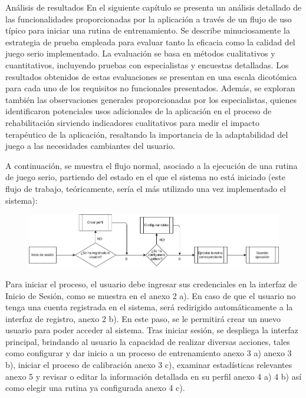 \begin{thesischapter}{3} {Análisis de resultados}
    En el siguiente capítulo se presenta un análisis detallado de las funcionalidades proporcionadas por la aplicación a 
    través de un flujo de uso típico para iniciar una rutina de entrenamiento. Se describe minuciosamente la estrategia 
    de prueba empleada para evaluar tanto la eficacia como la calidad del juego serio implementado. La evaluación se basa 
    en métodos cualitativos y cuantitativos, incluyendo pruebas con especialistas y encuestas detalladas. Los resultados 
    obtenidos de estas evaluaciones se presentan en una escala dicotómica para cada uno de los requisitos no funcionales
    presentados. Además, se exploran también las observaciones generales proporcionadas por los especialistas, quienes 
    identificaron potenciales usos adicionales de la aplicación en el proceso de rehabilitación sirviendo indicadores 
    cualitativos para medir el impacto terapéutico de la aplicación, resaltando la importancia de la adaptabilidad del 
    juego a las necesidades cambiantes del usuario.  
    


    A continuación, se muestra el flujo normal, asociado a la ejecución de una rutina
    de juego serio, partiendo del estado en el que el sistema no está iniciado (este flujo de trabajo,
    teóricamente, sería el más utilizado una vez implementado el sistema):

    \begin{figure}[ht]
        \centering
        \includegraphics[scale=0.5]{images/diagram-flow.png}
        \caption{}
        \label{fig: diagram-flow}
    \end{figure}
    
    Para iniciar el proceso, el usuario debe ingresar sus credenciales en la interfaz de Inicio de Sesión, 
    como se muestra en el anexo 2 a). En caso de que el usuario no tenga una cuenta registrada en el 
    sistema, será redirigido automáticamente a la interfaz de registro, anexo 2 b). 
    En este paso, se le permitirá crear un nuevo usuario para poder acceder al sistema. Tras iniciar sesión, se 
    despliega la interfaz principal, brindando al usuario la capacidad de realizar diversas 
    acciones, tales como configurar y dar inicio a un proceso de entrenamiento anexo 3 a) anexo 3 b), 
    iniciar el proceso de calibración anexo 3 c), examinar estadísticas relevantes anexo 5 y revisar o 
    editar la información detallada en su perfil anexo 4 a) 4 b) así como elegir una rutina ya configurada anexo 4 c).


\end{thesischapter}

